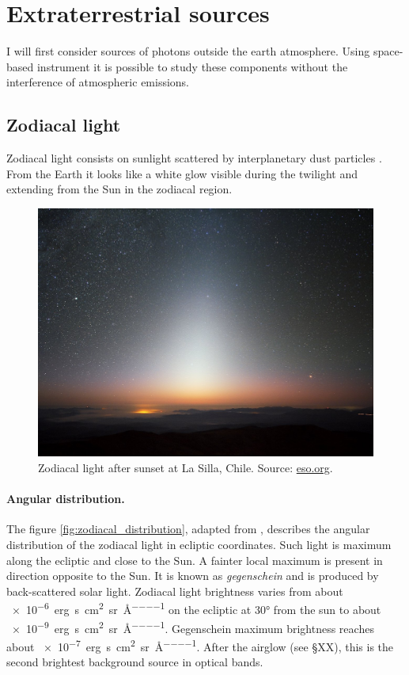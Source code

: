 \section{Extraterrestrial sources}
I will first consider sources of photons outside the earth atmosphere. Using space-based instrument it is possible to study these components without the interference of atmospheric emissions.

\subsection{Zodiacal light}
Zodiacal light consists on sunlight scattered by interplanetary dust particles \cite{leinert1975zodiacal}. From the Earth it looks like a white glow visible during the twilight and extending from the Sun in the zodiacal region.
\begin{figure}
	\centering
	\includegraphics[width=.8\textwidth]{./2_natural_sky/zodiacal_ima}
	\caption{Zodiacal light after sunset at La Silla, Chile. Source: \href{https://www.eso.org/public/images/zodiacal_beletsky_potw/}{eso.org}.\label{fig:zodiacal_ima}}
\end{figure}

\paragraph{Angular distribution.} The figure \ref{fig:zodiacal_distribution}, adapted from \cite{frey1974photometry}, describes the angular distribution of the zodiacal light in ecliptic coordinates. Such light is maximum along the ecliptic and close to the Sun. A fainter local maximum is present in direction opposite to the Sun. It is known as \emph{gegenschein} and is produced by back-scattered solar light. Zodiacal light brightness varies from about \SI{e-6}{erg\per\second \per\centi\metre\squared \per\steradian\per\angstrom} on the ecliptic at \ang{30} from the sun to about \SI{e-9}{erg\per\second \per\centi\metre\squared \per\steradian\per\angstrom}. Gegenschein maximum brightness reaches about \SI{e-7}{erg\per\second \per\centi\metre\squared \per\steradian\per\angstrom}. After the airglow (see \S XX), this is the second brightest background source in optical bands.

